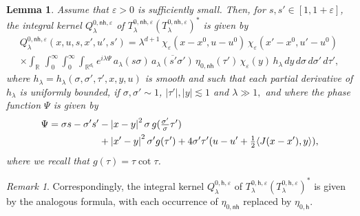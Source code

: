 \documentclass[leqno]{amsart}
\newtheorem{lemma}[theorem]{Lemma}
\theoremstyle{definition}
\theoremstyle{remark}
\newtheorem{remark}[theorem]{Remark}
\numberwithin{equation}{section}
\newcommand{\R}{\mathbb{R}}
\newcommand\ve{{\varepsilon}}
\begin{document}
\begin{lemma}\label{lem:0-TTstar}
Assume that $\ve>0$ is sufficiently small. Then, for $s,s'\in[1,1+\ve]$, the integral kernel $Q^{0,\mathsf{nh},\varepsilon}_\lambda$ of $T^{0,\mathsf{nh},\varepsilon}_\lambda (T^{0,\mathsf{nh},\varepsilon}_\lambda)^*$ is given by
\begin{multline}\label{eq:Q0}
Q^{0,\mathsf{nh},\varepsilon}_\lambda(x,u,s,x',u',s')
 = \lambda^{d + 1} \, \chi_{\varepsilon}(x-x^0,u-u^0) \, \chi_{\varepsilon}(x'-x^0,u'-u^0) \\
\times \int_\R \, \int_0^\infty \! \int_0^\infty \! \int_{\R^{d_1}}e^{i\lambda\Psi}  \, a_\lambda(s\sigma)  \,\overline{a_\lambda(s'\sigma')} \,\eta_{0,\mathsf{nh}}(\tau')  \, 
\chi_{\varepsilon}(y) \, h_\lambda \, dy \, d\sigma \, d\sigma' \, d\tau',
\end{multline}
where $h_\lambda=h_\lambda(\sigma,\sigma',\tau',x,y,u)$ is  smooth and  such that each partial derivative of $h_\lambda$ is uniformly bounded, if $\sigma,\sigma' \sim 1$, $ |\tau'|,|y| \lesssim 1$ and $\lambda\gg 1,$  and where the phase function $\Psi$  is given by 
\begin{align}
\Psi = \sigma s - \sigma's' & - \left|x-y\right|^2\sigma \, g(\tfrac{\sigma'}{\sigma}\tau') \notag \\ 
& + \left|x'-y\right|^2\sigma' g(\tau') + 4 \sigma'\tau'(u-u' + \tfrac12\langle J(x-x'),y \rangle), \label{eq:Psi}
\end{align}
where we recall that $g(\tau) = \tau\cot\tau$.
\end{lemma}

\begin{remark}\label{rem:h-variant}
Correspondingly, the integral kernel $Q^{0,\mathsf{h},\varepsilon}_\lambda$ of $T^{0,\mathsf{h}, \varepsilon}_\lambda (T^{0,\mathsf{h},\varepsilon}_\lambda)^*$ is given by the analogous formula, with each occurrence of $\eta_{0,\mathsf{nh}}$ replaced by $\eta_{0,\mathsf{h}}$.
\end{remark}
\end{document}
